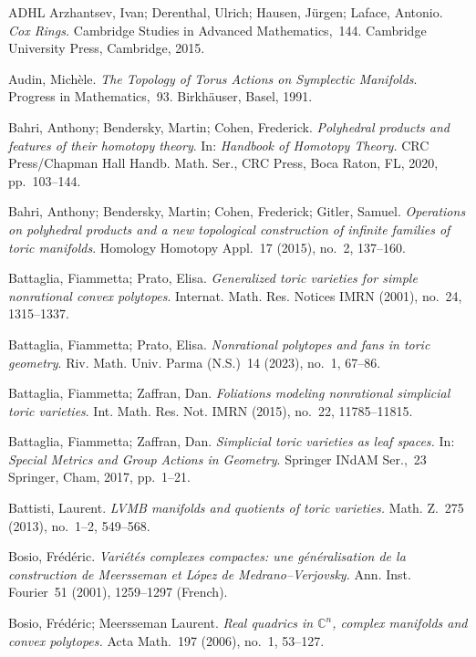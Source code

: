 \documentclass[a4paper]{amsart}
\theoremstyle{definition}
\theoremstyle{remark}
\numberwithin{equation}{section}
\newcommand{\<}{\langle}
\renewcommand{\>}{\rangle}
\begin{document}
\begin{thebibliography}{ADHL}
Arzhantsev, Ivan; Derenthal, Ulrich; Hausen, J\"urgen; Laface, Antonio. \emph{Cox Rings.} Cambridge Studies in Advanced Mathematics,~144. Cambridge University Press, Cambridge, 2015.

Audin, Mich\`ele. \emph{The Topology of Torus Actions on Symplectic
Manifolds}. Progress in Mathematics,~93. Birkh\"auser, Basel,
1991.

Bahri, Anthony; Bendersky, Martin; Cohen, Frederick. \emph{Polyhedral products and features of their homotopy theory}. In: \emph{Handbook of Homotopy Theory.} CRC Press/Chapman Hall Handb. Math. Ser., CRC Press, Boca Raton, FL, 2020, pp.~103--144.

Bahri, Anthony; Bendersky, Martin; Cohen, Frederick; Gitler, Samuel.
\emph{Operations on polyhedral products and a new topological construction of infinite families of toric 
manifolds}. Homology Homotopy Appl.~17 (2015), no.~2, 137--160.

Battaglia, Fiammetta; Prato, Elisa.
\emph{Generalized toric varieties for simple nonrational convex polytopes}.
Internat. Math. Res. Notices IMRN (2001), no.~24, 1315--1337.

Battaglia, Fiammetta; Prato, Elisa.
\emph{Nonrational polytopes and fans in toric geometry}.
Riv. Math. Univ. Parma (N.S.)~14 (2023), no.~1, 67--86.

Battaglia, Fiammetta; Zaffran, Dan.
\emph{Foliations modeling nonrational simplicial toric varieties}.
Int. Math. Res. Not. IMRN (2015), no.~22, 11785--11815.

Battaglia, Fiammetta; Zaffran, Dan.
\emph{Simplicial toric varieties as leaf spaces.} In: \emph{Special Metrics and Group Actions in Geometry}. Springer INdAM Ser.,~23
Springer, Cham, 2017, pp.~1--21.

Battisti, Laurent.
\emph{LVMB manifolds and quotients of toric varieties.}
Math. Z.~275 (2013), no.~1--2, 549--568.

Bosio, Fr\'ed\'eric. \emph{Vari\'et\'es complexes compactes: une
g\'en\'eralisation de la construction de Meersseman et L\'opez de
Medrano--Verjovsky.} Ann. Inst. Fourier~51 (2001),
1259--1297 (French).

Bosio, Fr\'ed\'eric; Meersseman Laurent. 
\emph{Real quadrics in $\mathbb C^n$, complex manifolds and convex polytopes.} 
Acta Math.~197 (2006), no.~1, 53--127.


\end{thebibliography}
\end{document}
